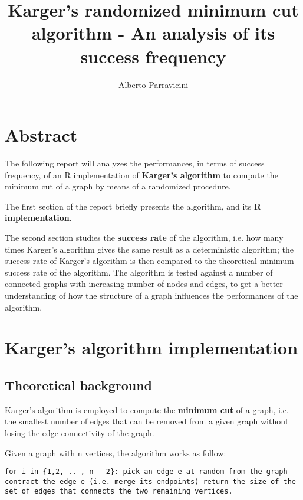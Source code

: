 \documentclass[
12pt,
a4paper,
oneside,
headinclude,
footinclude]{article}
\title{\textbf{Karger's randomized minimum cut algorithm - An analysis of its success frequency}}
\author{{Alberto Parravicini}}
\date{}	%
\begin{document}
\maketitle
{}
\setcounter{page}{1}

\section{Abstract}
The following report will analyzes the performances, in terms of success frequency, of an R implementation of \textbf{Karger's algorithm} to compute
the minimum cut of a graph by means of a randomized procedure.

The first section of the report briefly presents the algorithm, and its \textbf{R implementation}.

The second section studies the \textbf{success rate} of the algorithm,
i.e. how many times Karger's algorithm gives the same result as a deterministic algorithm;
the success rate of Karger's algorithm is then compared to the theoretical minimum success rate of the algorithm.\newline
The algorithm is tested against a number of connected graphs with increasing number of nodes and edges,
to get a better understanding of how the structure of a graph influences the performances of the algorithm.


\section{Karger's algorithm implementation}
\vspace{-5mm}
\subsection{Theoretical background}
\vspace{-5mm}
Karger's algorithm is employed to compute the \textbf{minimum cut} of a graph, i.e. the smallest number of edges that can be removed from a given graph without losing the edge connectivity of the graph.

Given a graph with n vertices, the algorithm works as follow:

\texttt {for i in \{1,2, .. , n - 2\}: \newline
	\null\quad\quad pick an edge e at random from the graph \newline
	\null\quad\quad contract the edge e (i.e. merge its endpoints) \newline
return the size of the set of edges that connects the two remaining vertices.}
\end{document}
